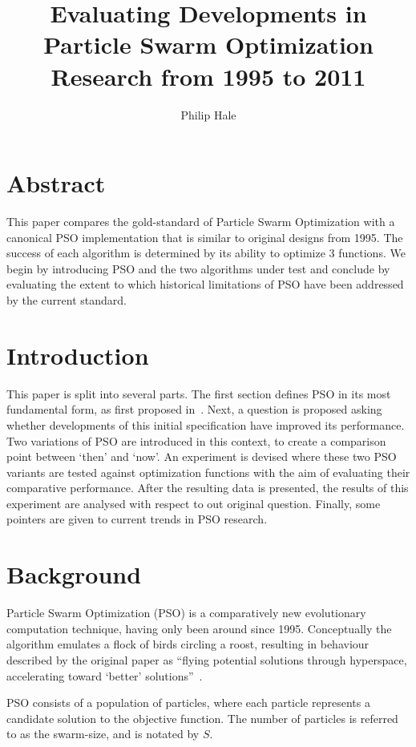 \documentclass{csfourzero}
\author{Philip Hale}
\title{Evaluating Developments in Particle Swarm Optimization Research from
1995 to 2011}
\begin{document}
\maketitle

\section{Abstract}

This paper compares the gold-standard of Particle Swarm Optimization with a
canonical PSO implementation that is similar to original designs from 1995.
The success of each algorithm is determined by its ability to optimize 3
functions. We begin by introducing PSO and the two algorithms under test and
conclude by evaluating the extent to which historical limitations of PSO have
been addressed by the current standard.

\section{Introduction}


This paper is split into several parts. The first section defines PSO in its
most fundamental form, as first proposed in~\cite{Kennedy:1995bi}. Next, a
question is proposed asking whether developments of this initial specification
have improved its performance. Two variations of PSO are introduced in this
context, to create a comparison point between `then' and `now'. An experiment
is devised where these two PSO variants are tested against optimization
functions with the aim of evaluating their comparative performance. After the
resulting data is presented, the results of this experiment are analysed with
respect to out original question. Finally, some pointers are given to current
trends in PSO research.

\section{Background}

Particle Swarm Optimization (PSO) is a comparatively new evolutionary
computation technique, having only been around since 1995.  Conceptually the
algorithm emulates a flock of birds circling a roost, resulting in  behaviour
described by the original paper as ``flying potential solutions through
hyperspace, accelerating toward `better' solutions''~\cite{Kennedy:1995bi}.

PSO consists of a population of particles, where each particle represents a
candidate solution to the objective function.  The number of particles is
referred to as the swarm-size, and is notated by $S$.
\end{document}
